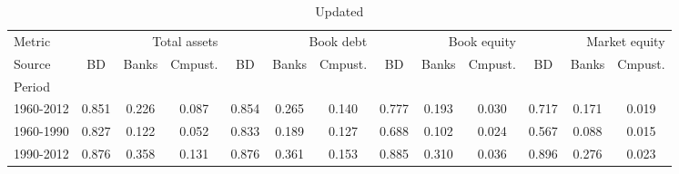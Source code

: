 
    \begin{table}[htbp]
      \centering
      \caption{Updated}
      \label{tab:Table 2}
      \small
      \begin{tabular}{lcccccccccccc}
\toprule
Metric & \multicolumn{3}{r}{Total assets} & \multicolumn{3}{r}{Book debt} & \multicolumn{3}{r}{Book equity} & \multicolumn{3}{r}{Market equity} \\
Source & BD & Banks & Cmpust. & BD & Banks & Cmpust. & BD & Banks & Cmpust. & BD & Banks & Cmpust. \\
Period &  &  &  &  &  &  &  &  &  &  &  &  \\
\midrule
1960-2012 & 0.851 & 0.226 & 0.087 & 0.854 & 0.265 & 0.140 & 0.777 & 0.193 & 0.030 & 0.717 & 0.171 & 0.019 \\
1960-1990 & 0.827 & 0.122 & 0.052 & 0.833 & 0.189 & 0.127 & 0.688 & 0.102 & 0.024 & 0.567 & 0.088 & 0.015 \\
1990-2012 & 0.876 & 0.358 & 0.131 & 0.876 & 0.361 & 0.153 & 0.885 & 0.310 & 0.036 & 0.896 & 0.276 & 0.023 \\
\bottomrule
\end{tabular}

    \end{table}
    